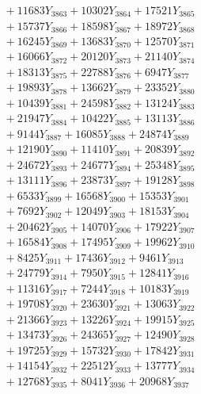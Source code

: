 \documentclass[a4paper,10pt]{article}
\begin{document}
{\begin{align}
&\;  + 11683 Y_{3863} + 10302 Y_{3864} + 17521 Y_{3865} \\[0.3ex]
&\;  + 15737 Y_{3866} + 18598 Y_{3867} + 18972 Y_{3868} \\[0.5ex]\allowbreak
&\;  + 16245 Y_{3869} + 13683 Y_{3870} + 12570 Y_{3871} \\[0.3ex]
&\;  + 16066 Y_{3872} + 20120 Y_{3873} + 21140 Y_{3874} \\[0.3ex]
&\;  + 18313 Y_{3875} + 22788 Y_{3876} + 6947 Y_{3877} \\[0.3ex]
&\;  + 19893 Y_{3878} + 13662 Y_{3879} + 23352 Y_{3880} \\[0.3ex]
&\;  + 10439 Y_{3881} + 24598 Y_{3882} + 13124 Y_{3883} \\[0.3ex]
&\;  + 21947 Y_{3884} + 10422 Y_{3885} + 13113 Y_{3886} \\[0.3ex]
&\;  + 9144 Y_{3887} + 16085 Y_{3888} + 24874 Y_{3889} \\[0.3ex]
&\;  + 12190 Y_{3890} + 11410 Y_{3891} + 20839 Y_{3892} \\[0.3ex]
&\;  + 24672 Y_{3893} + 24677 Y_{3894} + 25348 Y_{3895} \\[0.3ex]
&\;  + 13111 Y_{3896} + 23873 Y_{3897} + 19128 Y_{3898} \\[0.5ex]\allowbreak
&\;  + 6533 Y_{3899} + 16568 Y_{3900} + 15353 Y_{3901} \\[0.3ex]
&\;  + 7692 Y_{3902} + 12049 Y_{3903} + 18153 Y_{3904} \\[0.3ex]
&\;  + 20462 Y_{3905} + 14070 Y_{3906} + 17922 Y_{3907} \\[0.3ex]
&\;  + 16584 Y_{3908} + 17495 Y_{3909} + 19962 Y_{3910} \\[0.3ex]
&\;  + 8425 Y_{3911} + 17436 Y_{3912} + 9461 Y_{3913} \\[0.3ex]
&\;  + 24779 Y_{3914} + 7950 Y_{3915} + 12841 Y_{3916} \\[0.3ex]
&\;  + 11316 Y_{3917} + 7244 Y_{3918} + 10183 Y_{3919} \\[0.3ex]
&\;  + 19708 Y_{3920} + 23630 Y_{3921} + 13063 Y_{3922} \\[0.3ex]
&\;  + 21366 Y_{3923} + 13226 Y_{3924} + 19915 Y_{3925} \\[0.3ex]
&\;  + 13473 Y_{3926} + 24365 Y_{3927} + 12490 Y_{3928} \\[0.5ex]\allowbreak
&\;  + 19725 Y_{3929} + 15732 Y_{3930} + 17842 Y_{3931} \\[0.3ex]
&\;  + 14154 Y_{3932} + 22512 Y_{3933} + 13777 Y_{3934} \\[0.3ex]
&\;  + 12768 Y_{3935} + 8041 Y_{3936} + 20968 Y_{3937} \\[0.3ex]

\end{align}}
\end{document}
